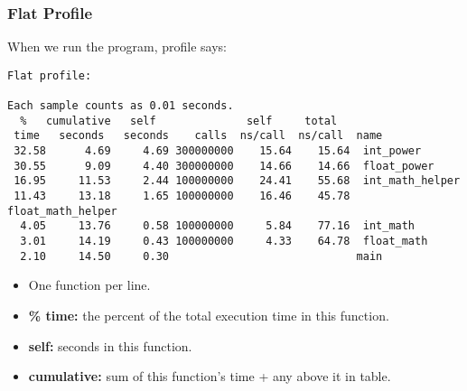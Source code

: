 \begin{frame}[fragile]
  \frametitle{Flat Profile}

\large
\begin{changemargin}{1.5cm}

    When we run the program, profile says:

{
  \begin{lstlisting}[basicstyle=\tiny]
Flat profile:

Each sample counts as 0.01 seconds.
  %   cumulative   self              self     total           
 time   seconds   seconds    calls  ns/call  ns/call  name    
 32.58      4.69     4.69 300000000    15.64    15.64  int_power
 30.55      9.09     4.40 300000000    14.66    14.66  float_power
 16.95     11.53     2.44 100000000    24.41    55.68  int_math_helper
 11.43     13.18     1.65 100000000    16.46    45.78  float_math_helper
  4.05     13.76     0.58 100000000     5.84    77.16  int_math
  3.01     14.19     0.43 100000000     4.33    64.78  float_math
  2.10     14.50     0.30                             main
  \end{lstlisting}
}

  \begin{itemize}
    \item One function per line.
    \item {\bf \% time:} the percent of the total execution time in this function.
    \item {\bf self:} seconds in this function.
    \item {\bf cumulative:} sum of this function's time + any above it in table.
  \end{itemize}
  \end{changemargin}
\end{frame}

